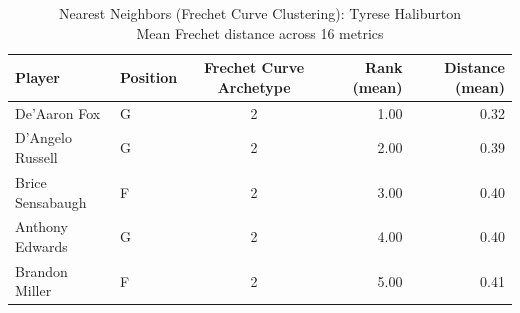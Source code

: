 \begin{table}[t]
\caption*{
{\fontsize{20}{25} Nearest Neighbors (Frechet Curve Clustering): Tyrese Haliburton\fontsize{12}{15}\selectfont } \\ 
{\fontsize{14}{17}\selectfont  Mean Frechet distance across 16 metrics\fontsize{12}{15}\selectfont }
} 
\fontsize{12.0pt}{14.0pt}\selectfont
\begin{tabular*}{\linewidth}{@{\extracolsep{\fill}}llcrr}
\toprule
Player & Position & Frechet Curve Archetype & Rank (mean) & Distance (mean) \\ 
\midrule\addlinespace[2.5pt]
De'Aaron Fox & G & 2 & 1.00 & 0.32 \\ 
D'Angelo Russell & G & 2 & 2.00 & 0.39 \\ 
Brice Sensabaugh & F & 2 & 3.00 & 0.40 \\ 
Anthony Edwards & G & 2 & 4.00 & 0.40 \\ 
Brandon Miller & F & 2 & 5.00 & 0.41 \\ 
\bottomrule
\end{tabular*}
\end{table}

